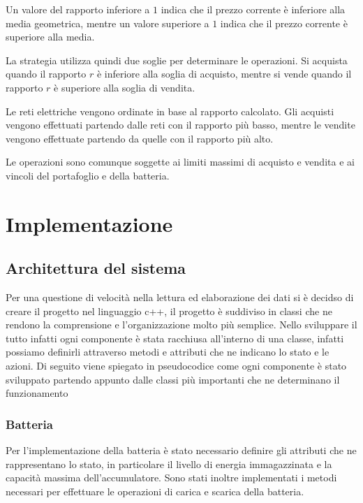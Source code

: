 \documentclass[a4paper,oneside,italian]{sapthesis}
\begin{document}
Un valore del rapporto inferiore a $1$ indica che il prezzo corrente è
inferiore alla media geometrica, mentre un valore superiore a $1$ indica
che il prezzo corrente è superiore alla media.

La strategia utilizza quindi due soglie per determinare le operazioni.
Si acquista quando il rapporto $r$ è inferiore alla soglia di acquisto,
mentre si vende quando il rapporto $r$ è superiore alla soglia di vendita.

Le reti elettriche vengono ordinate in base al rapporto calcolato. Gli acquisti
vengono effettuati partendo dalle reti con il rapporto più basso, mentre le
vendite vengono effettuate partendo da quelle con il rapporto più alto.

Le operazioni sono comunque soggette ai limiti massimi di acquisto e vendita
e ai vincoli del portafoglio e della batteria.

\chapter{Implementazione}

\label{chap:implementation}

\section{Architettura del sistema}

Per una questione di velocità nella lettura ed elaborazione dei dati si è decidso
di creare il progetto nel linguaggio c++, il progetto è suddiviso in classi che 
ne rendono la comprensione e l'organizzazione molto più semplice.
Nello sviluppare il tutto infatti ogni componente è stata racchiusa all'interno di 
una classe, infatti possiamo definirli attraverso metodi e attributi che ne indicano 
lo stato e le azioni.
Di seguito viene spiegato in pseudocodice come ogni componente è stato sviluppato 
partendo appunto dalle classi più importanti che ne determinano il funzionamento 

\subsection{Batteria}

Per l'implementazione della batteria è stato necessario definire gli attributi
che ne rappresentano lo stato, in particolare il livello di energia
immagazzinata e la capacità massima dell'accumulatore. Sono stati inoltre
implementati i metodi necessari per effettuare le operazioni di carica e
scarica della batteria.
\end{document}
